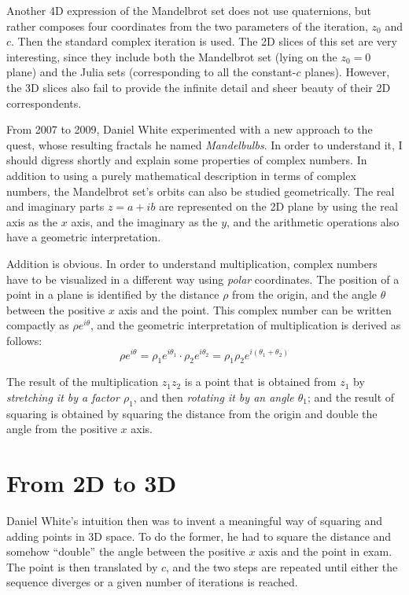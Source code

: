\documentclass{article}
\begin{document}
Another 4D expression of the Mandelbrot set does not use quaternions,
but rather composes four coordinates from the two parameters of
the iteration, $z_0$ and $c$.  Then the standard complex iteration
is used.  The 2D slices of this set are very interesting, since
they include both the Mandelbrot set (lying on the $z_0=0$ plane)
and the Julia sets (corresponding to all the constant-$c$ planes).
However, the 3D slices also fail to provide the infinite detail
and sheer beauty of their 2D correspondents.

From 2007 to 2009, Daniel White experimented with a new approach to
the quest, whose resulting fractals he named \emph{Mandelbulbs}.  In
order to understand it, I should digress shortly and explain some
properties of complex numbers.  In addition to using a purely
mathematical description in terms of complex numbers, the Mandelbrot
set's orbits can also be studied geometrically.  The real and
imaginary parts $z=a+ib$ are represented on the 2D plane by using the
real axis as the $x$ axis, and the imaginary as the $y$, and the
arithmetic operations also have a geometric interpretation.

Addition is obvious.  In order to understand multiplication, complex
numbers have to be visualized in a different way using \emph{polar}
coordinates.  The position of a point in a plane is identified by the
distance $\rho$ from the origin, and the angle $\theta$ between the
positive $x$ axis and the point.  This complex number can be written
compactly as $\rho e^{i \theta}$, and the geometric interpretation
of multiplication is derived as follows:
\begin{equation*}
  \rho e^{i \theta} =  \rho_1 e^{i \theta_1} \cdot \rho_2 e^{i \theta_2}
    = \rho_1\rho_2 e^{i (\theta_1 + \theta_2)}
\end{equation*}
  
\noindent
The result of the multiplication $z_1 z_2$ is a point that is obtained
from $z_1$ by \emph{stretching it by a factor $\rho_1$}, and
then \emph{rotating it by an angle $\theta_1$}; and the result of
squaring is obtained by squaring the distance from the origin and
double the angle from the positive $x$ axis.

\section{From 2D to 3D}

Daniel White's intuition then was to invent a meaningful way of squaring
and adding points in 3D space.  To do the former, he had to square
the distance and somehow ``double'' the angle between the positive $x$
axis and the point in exam.  The point is then translated by $c$, and
the two steps are repeated until either the sequence diverges or a given
number of iterations is reached.
\end{document}
